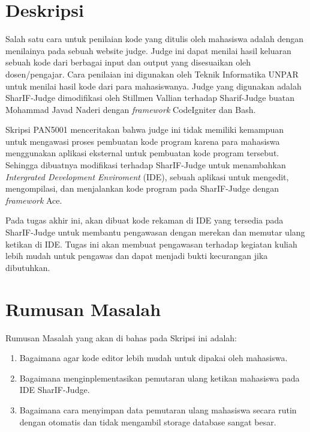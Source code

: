 \documentclass[a4paper,twoside]{article}
\begin{document}
\title{\@judultopik}
\author{\nama \textendash \@npm} 

\newcommand{\nama}{Andreas Ronaldi}
\newcommand{\@npm}{6182101026}
\newcommand{\@judultopik}{Pemutar Ulang Ketikan Mahasiswa pada SharIF Judge } %
\newcommand{\jumpemb}{1} %
\newcommand{\tanggal}{01/01/1900}


\maketitle


\section{Deskripsi}
Salah satu cara untuk penilaian kode yang ditulis oleh mahasiswa adalah dengan menilainya pada sebuah website judge. Judge ini dapat menilai hasil keluaran sebuah kode dari berbagai input dan output yang disesuaikan oleh dosen/pengajar. Cara penilaian ini digunakan oleh Teknik Informatika UNPAR untuk menilai hasil kode dari para mahasiswanya. Judge yang digunakan adalah SharIF-Judge dimodifikasi oleh Stillmen Vallian terhadap Sharif-Judge buatan Mohammad Javad Naderi dengan \textit{framework} CodeIgniter dan Bash.

Skripsi PAN5001 menceritakan bahwa judge ini tidak memiliki kemampuan untuk mengawasi proses pembuatan kode program karena para mahasiswa menggunakan aplikasi eksternal untuk pembuatan kode program tersebut. Sehingga dibuatnya modifikasi terhadap SharIF-Judge untuk menambahkan \textit{Intergrated Development Enviroment} (IDE), sebuah aplikasi untuk mengedit, mengompilasi, dan menjalankan kode program pada SharIF-Judge dengan \textit{framework} Ace.

Pada tugas akhir ini, akan dibuat kode rekaman di IDE yang tersedia pada SharIF-Judge untuk membantu pengawasan dengan merekan dan memutar ulang ketikan di IDE. Tugas ini akan membuat pengawasan terhadap kegiatan kuliah lebih mudah untuk pengawas dan dapat menjadi bukti kecurangan jika dibutuhkan.

\section{Rumusan Masalah}
Rumusan Masalah yang akan di bahas pada Skripsi ini adalah:
 \begin{enumerate}
     \item Bagaimana agar kode editor lebih mudah untuk dipakai oleh mahasiswa.
     \item Bagaimana menginplementasikan pemutaran ulang ketikan mahasiswa pada IDE SharIF-Judge.
     \item Bagaimana cara menyimpan data pemutaran ulang mahasiswa secara rutin dengan otomatis dan tidak mengambil storage database sangat besar.
 \end{enumerate}
\end{document}
